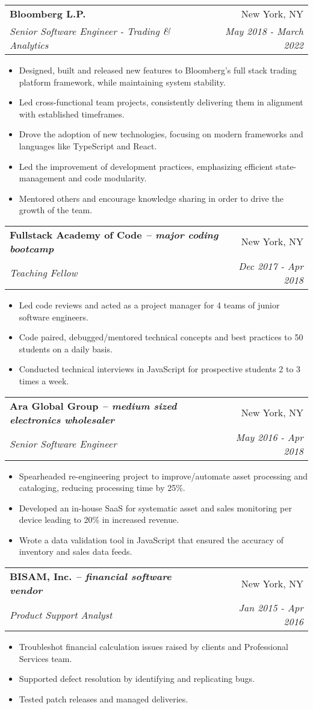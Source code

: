 \documentclass[letterpaper,10pt,usenames,dvipsnames]{article}
\makeatletter
\newcommand{\resumeItemSimple}[1]{
  \item\small{
    {#1}{\vspace{-2pt}}
  }
}
\newcommand{\resumeSubheading}[4]{
  \vspace{-1pt}\item
    \begin{tabular*}{0.97\textwidth}{l@{\extracolsep{\fill}}r}
      \textbf{#1} & #2 \\
      \textit{\small#3} & \textit{\small #4} \\
    \end{tabular*}\vspace{-5pt}
}
\newcommand{\resumeItemListStart}{\begin{itemize}}
\newcommand{\resumeItemListEnd}{\end{itemize}\vspace{-5pt}}
\newcommand{\engineerType}{Senior Software Engineer}
\makeatother
\begin{document}
    \resumeSubheading
      {Bloomberg L.P.}{New York, NY}
      {Senior Software Engineer - Trading \& Analytics}{May 2018 - March 2022}
      \resumeItemListStart
        \resumeItemSimple{Designed, built and released new features to Bloomberg's full stack trading platform framework, while maintaining system stability.}
        \resumeItemSimple{Led cross-functional team projects, consistently delivering them in alignment with established timeframes.}
        \resumeItemSimple{Drove the adoption of new technologies, focusing on modern frameworks and languages like TypeScript and React.}
        \resumeItemSimple{Led the improvement of development practices, emphasizing efficient state-management and code modularity.}
        \resumeItemSimple{Mentored others and encourage knowledge sharing in order to drive the growth of the team.}
      \resumeItemListEnd

    \resumeSubheading
      {Fullstack Academy of Code \normalfont\textit{-- major coding bootcamp}}{New York, NY}
      {Teaching Fellow}{Dec 2017 - Apr 2018}
      \resumeItemListStart
        \resumeItemSimple{Led code reviews and acted as a project manager for 4 teams of junior software engineers.}
        \resumeItemSimple{Code paired, debugged/mentored technical concepts and best practices to 50 students on a daily basis.}
        \resumeItemSimple{Conducted technical interviews in JavaScript for prospective students 2 to 3 times a week.}
      \resumeItemListEnd

    \resumeSubheading
      {Ara Global Group \normalfont\textit{-- medium sized electronics wholesaler}}{New York, NY}
      {\engineerType{}}{May 2016 - Apr 2018}
      \resumeItemListStart
      	\resumeItemSimple{Spearheaded re-engineering project to improve/automate asset processing and  cataloging, reducing processing time by 25\%.}
        \resumeItemSimple{Developed an in-house SaaS for systematic asset and sales monitoring per device leading to 20\% in increased revenue.}
        \resumeItemSimple{Wrote a data validation tool in JavaScript that ensured the accuracy of inventory and sales data feeds.}
      \resumeItemListEnd

    \resumeSubheading
      {BISAM, Inc. \normalfont\textit{-- financial software vendor}}{New York, NY}
      {Product Support Analyst}{Jan 2015 - Apr 2016}
      \resumeItemListStart
        \resumeItemSimple{Troubleshot financial calculation issues raised by clients and Professional Services team.}
        \resumeItemSimple{Supported defect resolution by identifying and replicating bugs.}
        \resumeItemSimple{Tested patch releases and managed deliveries.}
      \resumeItemListEnd
\end{document}

